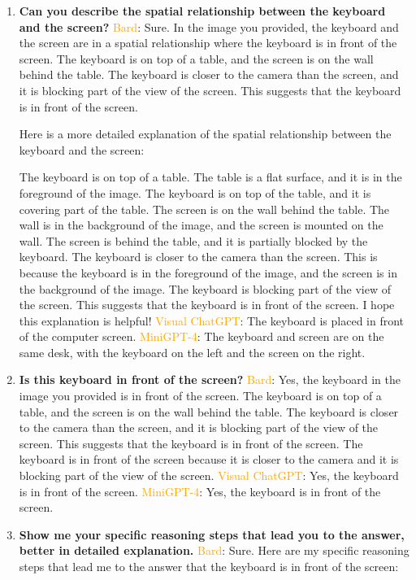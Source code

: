 \begin{enumerate}
    \item \textbf{Can you describe the spatial relationship between the keyboard and the screen?}
    \subitem \textcolor{orange}{Bard}: Sure. In the image you provided, the keyboard and the screen are in a spatial relationship where the keyboard is in front of the screen. The keyboard is on top of a table, and the screen is on the wall behind the table. The keyboard is closer to the camera than the screen, and it is blocking part of the view of the screen. This suggests that the keyboard is in front of the screen.

    Here is a more detailed explanation of the spatial relationship between the keyboard and the screen:
    
    The keyboard is on top of a table. The table is a flat surface, and it is in the foreground of the image. The keyboard is on top of the table, and it is covering part of the table.
    The screen is on the wall behind the table. The wall is in the background of the image, and the screen is mounted on the wall. The screen is behind the table, and it is partially blocked by the keyboard.
    The keyboard is closer to the camera than the screen. This is because the keyboard is in the foreground of the image, and the screen is in the background of the image.
    The keyboard is blocking part of the view of the screen. This suggests that the keyboard is in front of the screen.
    I hope this explanation is helpful!
    \subitem \textcolor{orange}{Visual ChatGPT}: The keyboard is placed in front of the computer screen.
    \subitem \textcolor{orange}{MiniGPT-4}: The keyboard and screen are on the same desk, with the keyboard on the left and the screen on the right.
    \item \textbf{Is this keyboard in front of the screen?}
    \subitem \textcolor{orange}{Bard}: Yes, the keyboard in the image you provided is in front of the screen. The keyboard is on top of a table, and the screen is on the wall behind the table. The keyboard is closer to the camera than the screen, and it is blocking part of the view of the screen. This suggests that the keyboard is in front of the screen. The keyboard is in front of the screen because it is closer to the camera and it is blocking part of the view of the screen.
    \subitem \textcolor{orange}{Visual ChatGPT}: Yes, the keyboard is in front of the screen.
    \subitem \textcolor{orange}{MiniGPT-4}: Yes, the keyboard is in front of the screen.
    \item \textbf{Show me your specific reasoning steps that lead you to the answer, better in detailed explanation.}
    \subitem \textcolor{orange}{Bard}: 
    Sure. Here are my specific reasoning steps that lead me to the answer that the keyboard is in front of the screen:
    

\end{enumerate}

